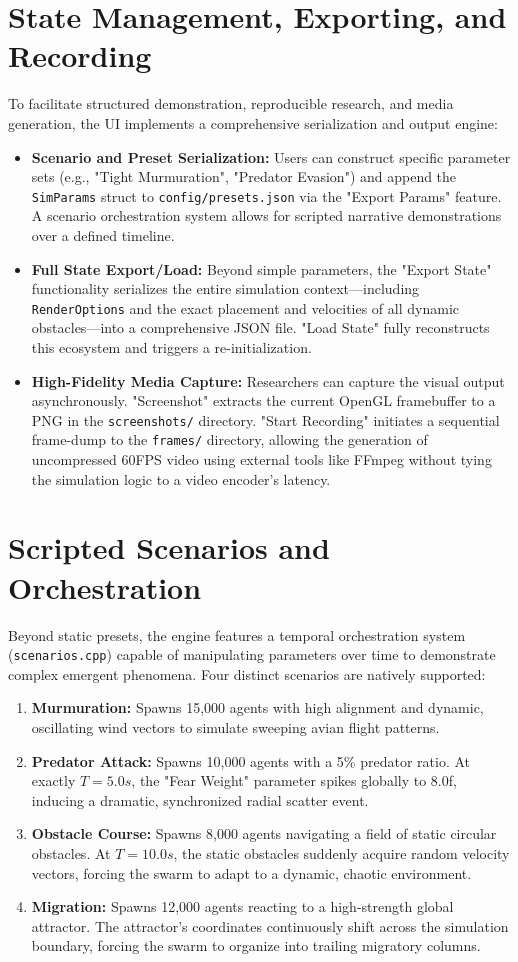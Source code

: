 \documentclass[12pt,a4paper]{report}
\begin{document}
\section{State Management, Exporting, and Recording}
To facilitate structured demonstration, reproducible research, and media generation, the UI implements a comprehensive serialization and output engine:
\begin{itemize}
    \item \textbf{Scenario and Preset Serialization:} Users can construct specific parameter sets (e.g., "Tight Murmuration", "Predator Evasion") and append the \texttt{SimParams} struct to \texttt{config/presets.json} via the "Export Params" feature. A scenario orchestration system allows for scripted narrative demonstrations over a defined timeline.
    \item \textbf{Full State Export/Load:} Beyond simple parameters, the "Export State" functionality serializes the entire simulation context—including \texttt{RenderOptions} and the exact placement and velocities of all dynamic obstacles—into a comprehensive JSON file. "Load State" fully reconstructs this ecosystem and triggers a re-initialization.
    \item \textbf{High-Fidelity Media Capture:} Researchers can capture the visual output asynchronously. "Screenshot" extracts the current OpenGL framebuffer to a PNG in the \texttt{screenshots/} directory. "Start Recording" initiates a sequential frame-dump to the \texttt{frames/} directory, allowing the generation of uncompressed 60FPS video using external tools like FFmpeg without tying the simulation logic to a video encoder's latency.
\end{itemize}

\section{Scripted Scenarios and Orchestration}
Beyond static presets, the engine features a temporal orchestration system (\texttt{scenarios.cpp}) capable of manipulating parameters over time to demonstrate complex emergent phenomena. Four distinct scenarios are natively supported:
\begin{enumerate}
    \item \textbf{Murmuration:} Spawns 15,000 agents with high alignment and dynamic, oscillating wind vectors to simulate sweeping avian flight patterns.
    \item \textbf{Predator Attack:} Spawns 10,000 agents with a 5\% predator ratio. At exactly $T=5.0s$, the "Fear Weight" parameter spikes globally to 8.0f, inducing a dramatic, synchronized radial scatter event.
    \item \textbf{Obstacle Course:} Spawns 8,000 agents navigating a field of static circular obstacles. At $T=10.0s$, the static obstacles suddenly acquire random velocity vectors, forcing the swarm to adapt to a dynamic, chaotic environment.
    \item \textbf{Migration:} Spawns 12,000 agents reacting to a high-strength global attractor. The attractor's coordinates continuously shift across the simulation boundary, forcing the swarm to organize into trailing migratory columns.
\end{enumerate}
\end{document}
